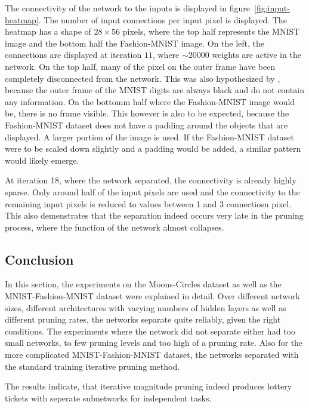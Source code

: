 The connectivity of the network to the inputs is displayed in figure~\ref{fig:input-heatmap}.
The number of input connections per input pixel is displayed.
The heatmap has a shape of $28\times56$ pixels, where the top half represents the MNIST image and the bottom half the Fashion-MNIST image.
On the left, the connections are displayed at iteration $11$, where $\sim20000$ weights are active in the network.
On the top half, many of the pixel on the outer frame have been completely disconnected from the network.
This was also hypothesized by \textcite{LTH}, because the outer frame of the MNIST digits are always black and do not contain any information.
On the bottomm half where the Fashion-MNIST image would be, there is no frame visible.
This however is also to be expected, because the Fashion-MNIST dataset does not have a padding around the objects that are displayed. 
A larger portion of the image is used.
If the Fashion-MNIST dataset were to be scaled down slightly and a padding would be added, a similar pattern would likely emerge.

At iteration 18, where the network separated, the connectivity is already highly sparse.
Only around half of the input pixels are used and the connectivity to the remaining input pixels is reduced to values between 1 and 3 connectiosn pixel.
This also demenstrates that the separation indeed occurs very late in the pruning process, where the function of the network almost collapses.

\subsection{Conclusion}
In this section, the experiments on the Moons-Circles dataset as well as the MNIST-Fashion-MNIST dataset were explained in detail.
Over different network sizes, different architectures with varying numbers of hidden layers as well as different pruning rates, the networks separate quite reliably, given the right conditions.
The experiments where the network did not separate either had too small networks, to few pruning levels and too high of a pruning rate.
Also for the more complicated MNIST-Fashion-MNIST dataset, the networks separated with the standard training iterative pruning method.

The results indicate, that iterative magnitude pruning indeed produces lottery tickets with seperate subnetworks for independent tasks.
